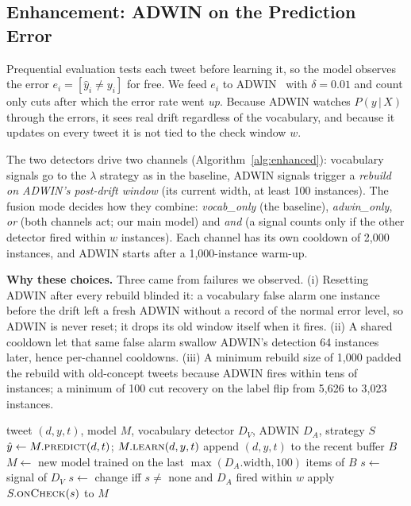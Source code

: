 \documentclass[conference]{IEEEtran}
\begin{document}
\subsection{Enhancement: ADWIN on the Prediction Error}
Prequential evaluation tests each tweet before learning it, so the model observes the error
$e_i = [\hat{y}_i \neq y_i]$ for free. We feed $e_i$ to ADWIN~\cite{bifet2007,montiel2021} with
$\delta = 0.01$ and count only cuts after which the error rate went \emph{up}. Because ADWIN
watches $P(y\,|\,X)$ through the errors, it sees real drift regardless of the vocabulary, and
because it updates on every tweet it is not tied to the check window $w$.

The two detectors drive two channels (Algorithm~\ref{alg:enhanced}): vocabulary signals go to the
$\lambda$ strategy as in the baseline, ADWIN signals trigger a \emph{rebuild on ADWIN's post-drift
window} (its current width, at least 100 instances). The fusion mode decides how they combine:
\emph{vocab\_only} (the baseline), \emph{adwin\_only}, \emph{or} (both channels act; our main
model) and \emph{and} (a signal counts only if the other detector fired within $w$ instances).
Each channel has its own cooldown of 2{,}000 instances, and ADWIN starts after a 1{,}000-instance
warm-up.

\textbf{Why these choices.} Three came from failures we observed. (i) Resetting ADWIN after
every rebuild blinded it: a vocabulary false alarm one instance before the drift left a fresh
ADWIN without a record of the normal error level, so ADWIN is never reset; it drops its old
window itself when it fires. (ii) A shared cooldown let that same false alarm swallow ADWIN's
detection 64 instances later, hence per-channel cooldowns. (iii) A minimum rebuild size of
1{,}000 padded the rebuild with old-concept tweets because ADWIN fires within tens of instances;
a minimum of 100 cut recovery on the label flip from 5{,}626 to 3{,}023 instances.

\begin{algorithm}[t]
\caption{Enhanced informed ageing MNB, one prequential step}\label{alg:enhanced}
\begin{algorithmic}[1]
\Require tweet $(d, y, t)$, model $M$, vocabulary detector $D_V$, ADWIN $D_A$, strategy $S$
\State $\hat{y} \gets M.\textsc{predict}(d, t)$; \quad $M.\textsc{learn}(d, y, t)$
\State append $(d, y, t)$ to the recent buffer $B$
      \State $M \gets$ new model trained on the last $\max(D_A.\mathrm{width}, 100)$ items of $B$
    \EndIf
  \EndIf
\EndIf
{}
  \State $s \gets$ signal of $D_V$ 
   $s \gets$ change iff $s \neq$ none and $D_A$ fired within $w$ \EndIf
  \State apply $S.\textsc{onCheck}(s)$ to $M$ 
\EndIf
\end{algorithmic}
\end{algorithm}
\end{document}
